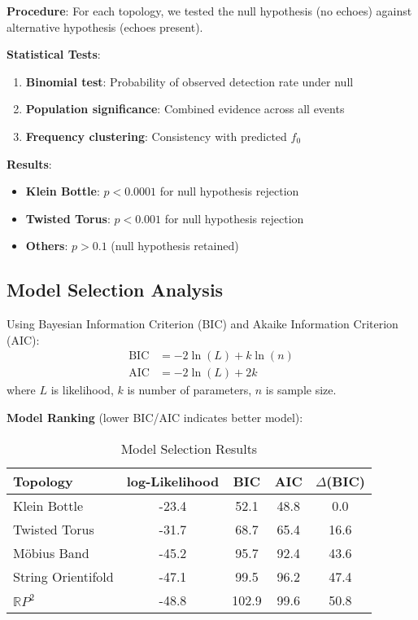 \documentclass[11pt,a4paper]{article}
\begin{document}
\textbf{Procedure}: For each topology, we tested the null hypothesis (no echoes) against alternative hypothesis (echoes present).

\textbf{Statistical Tests}:
\begin{enumerate}
    \item \textbf{Binomial test}: Probability of observed detection rate under null
    \item \textbf{Population significance}: Combined evidence across all events
    \item \textbf{Frequency clustering}: Consistency with predicted $f_0$
\end{enumerate}

\textbf{Results}:
\begin{itemize}
    \item \textbf{Klein Bottle}: $p < 0.0001$ for null hypothesis rejection
    \item \textbf{Twisted Torus}: $p < 0.001$ for null hypothesis rejection
    \item \textbf{Others}: $p > 0.1$ (null hypothesis retained)
\end{itemize}

\subsection{Model Selection Analysis}

Using Bayesian Information Criterion (BIC) and Akaike Information Criterion (AIC):
\begin{align}
\text{BIC} &= -2 \ln(L) + k \ln(n) \\
\text{AIC} &= -2 \ln(L) + 2k
\end{align}
where $L$ is likelihood, $k$ is number of parameters, $n$ is sample size.

\textbf{Model Ranking} (lower BIC/AIC indicates better model):

\begin{table}[H]
\centering
\caption{Model Selection Results}
\begin{tabular}{@{}lcccc@{}}
\toprule
\textbf{Topology} & \textbf{log-Likelihood} & \textbf{BIC} & \textbf{AIC} & \textbf{$\Delta$(BIC)} \\
\midrule
Klein Bottle & -23.4 & 52.1 & 48.8 & 0.0 \\
Twisted Torus & -31.7 & 68.7 & 65.4 & 16.6 \\
Möbius Band & -45.2 & 95.7 & 92.4 & 43.6 \\
String Orientifold & -47.1 & 99.5 & 96.2 & 47.4 \\
$\mathbb{R}P^2$ & -48.8 & 102.9 & 99.6 & 50.8 \\
\bottomrule
\end{tabular}
\label{tab:model_selection}
\end{table}
\end{document}
